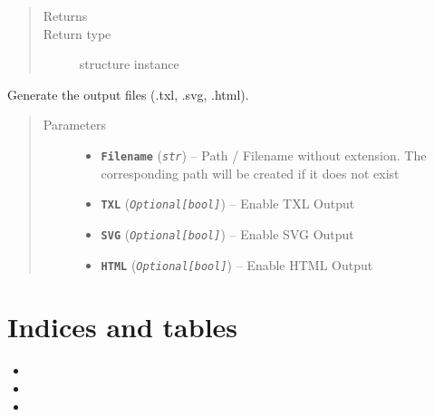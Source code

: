 \documentclass[letterpaper,10pt,english]{sphinxmanual}
\begin{document}
\begin{fulllineitems}
\begin{fulllineitems}
\begin{quote}
\begin{description}
\item[{Returns}] \leavevmode


\item[{Return type}] \leavevmode
{} structure instance

\end{description}\end{quote}

\end{fulllineitems}


\begin{fulllineitems}
\label{Chapters/40_PythonModuleReference:TXLWizard.TXLWriter.TXLWriter.GenerateFiles}
Generate the output files (.txl, .svg, .html).
\begin{quote}\begin{description}
\item[{Parameters}] \leavevmode\begin{itemize}
\item {} 
\textbf{\texttt{Filename}} (\emph{\texttt{str}}) -- Path / Filename without extension.
The corresponding path will be created if it does not exist

\item {} 
\textbf{\texttt{TXL}} (\emph{\texttt{Optional{[}bool{]}}}) -- Enable TXL Output

\item {} 
\textbf{\texttt{SVG}} (\emph{\texttt{Optional{[}bool{]}}}) -- Enable SVG Output

\item {} 
\textbf{\texttt{HTML}} (\emph{\texttt{Optional{[}bool{]}}}) -- Enable HTML Output

\end{itemize}

\end{description}\end{quote}

\end{fulllineitems}


\end{fulllineitems}



\chapter{Indices and tables}
\label{index:indices-and-tables}\begin{itemize}
\item {} 

\item {} 

\item {} 

\end{itemize}
\end{document}
